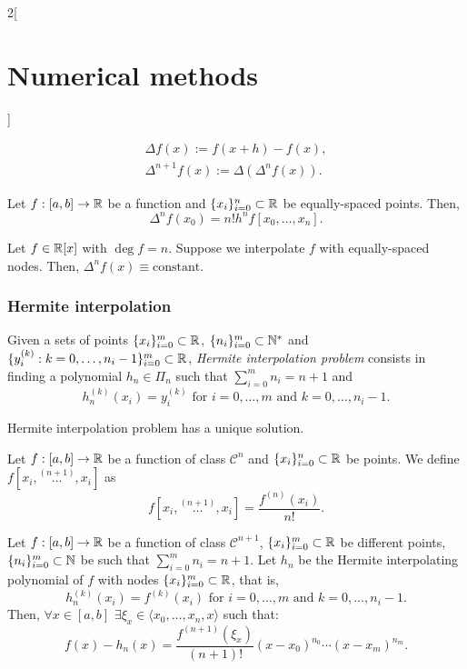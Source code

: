 \documentclass[../../../main.tex]{subfiles}
\begin{document}
\begin{multicols}{2}[\section{Numerical methods}]
\begin{definition}
\begin{gather*}
        \Delta f(x):=f(x+h)-f(x),\\
        \Delta^{n+1}f(x):=\Delta(\Delta^nf(x)).
    \end{gather*}
\end{definition}
\begin{lemma}
    Let $f:[a,b]\rightarrow\mathbb{R}$ be a function and $\{x_i\}_{i=0}^n\subset\mathbb{R}$ be equally-spaced points. Then, $$\Delta^nf(x_0)=n!h^nf[x_0,\ldots,x_n].$$
\end{lemma}
\begin{corollary}
    Let $f\in\mathbb{R}[x]$ with $\deg f=n$. Suppose we interpolate $f$ with equally-spaced nodes. Then, $\Delta^nf(x)\equiv\text{constant}$.
\end{corollary}
\subsubsection{Hermite interpolation}
\begin{definition}
    Given a sets of points $\{x_i\}_{i=0}^m\subset\mathbb{R}$, $\{n_i\}_{i=0}^m\subset\mathbb{N}^*$ and $\{y_i^{(k)}:k=0,\ldots,n_i-1\}_{i=0}^m\subset\mathbb{R}$, \textit{Hermite interpolation problem} consists in finding a polynomial $h_n\in\Pi_n$ such that $\sum_{i=0}^mn_i=n+1$ and $$h_n^{(k)}(x_i)=y_i^{(k)}\text{ for }i=0,\ldots,m\text{ and }k=0,\ldots,n_i-1.$$
\end{definition}
\begin{prop}
    Hermite interpolation problem has a unique solution.
\end{prop}
\begin{prop}
    Let $f:[a,b]\rightarrow\mathbb{R}$ be a function of class $\mathcal{C}^n$ and $\{x_i\}_{i=0}^n\subset\mathbb{R}$ be points. We define $f[x_i,\overset{(n+1)}{\ldots},x_i]$ as $$f[x_i,\overset{(n+1)}{\ldots},x_i]=\frac{f^{(n)}(x_i)}{n!}.$$
\end{prop}
\begin{theorem}
    Let $f:[a,b]\rightarrow\mathbb{R}$ be a function of class $\mathcal{C}^{n+1}$, $\{x_i\}_{i=0}^m\subset\mathbb{R}$ be different points, $\{n_i\}_{i=0}^m\subset\mathbb{N}$ be such that $\sum_{i=0}^mn_i=n+1$. Let $h_n$ be the Hermite interpolating polynomial of $f$ with nodes $\{x_i\}_{i=0}^m\subset\mathbb{R}$, that is, $$h_n^{(k)}(x_i)=f^{(k)}(x_i)\text{ for }i=0,\ldots,m\text{ and }k=0,\ldots,n_i-1.$$ Then, $\forall x\in[a,b]$ $\exists\xi_x\in\langle x_0,\ldots,x_n,x\rangle$ such that: $$f(x)-h_n(x)=\frac{f^{(n+1)}(\xi_x)}{(n+1)!}(x-x_0)^{n_0}\cdots(x-x_m)^{n_m}.$$
\end{theorem}

\end{multicols}
\end{document}
